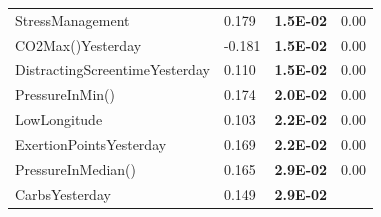 \documentclass[conference]{IEEEtran}
\begin{document}
\begin{table}[]
\begin{tabular}{llll}
StressManagement               & 0.179  & \textbf{1.5E-02} & 0.00           \\
CO2Max()Yesterday              & -0.181 & \textbf{1.5E-02} & 0.00           \\
DistractingScreentimeYesterday & 0.110  & \textbf{1.5E-02} & 0.00           \\
PressureInMin()                & 0.174  & \textbf{2.0E-02} & 0.00           \\
LowLongitude                   & 0.103  & \textbf{2.2E-02} & 0.00           \\
ExertionPointsYesterday        & 0.169  & \textbf{2.2E-02} & 0.00           \\
PressureInMedian()             & 0.165  & \textbf{2.9E-02} & 0.00           \\
CarbsYesterday                 & 0.149  & \textbf{2.9E-02} &                \\
\end{tabular}
\end{table}
\end{document}
